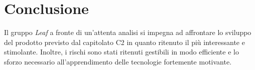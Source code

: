\documentclass[../StudioDiFattibilita.tex]{subfiles}
\begin{document}
\section{Conclusione}
Il gruppo \textit{Leaf} a fronte di un'attenta analisi si impegna ad affrontare lo sviluppo del prodotto previsto dal capitolato C2 in quanto ritenuto il più interessante e stimolante. Inoltre, i rischi sono stati ritenuti gestibili in modo efficiente e lo sforzo necessario all'apprendimento delle tecnologie fortemente motivante.
\end{document}
